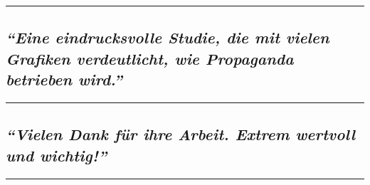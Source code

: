 \begin{center}\rule{0.5\linewidth}{\linethickness}\end{center}

\hypertarget{eine-eindrucksvolle-studie-die-mit-vielen-grafiken-verdeutlicht-wie-propaganda-betrieben-wird}{%
\subsection{\texorpdfstring{\emph{``Eine eindrucks­volle Studie, die mit
vielen Gra­fi­ken verdeut­licht, wie Propaganda betrieben
wird.''}}{``Eine eindrucks­volle Studie, die mit vielen Gra­fi­ken verdeut­licht, wie Propaganda betrieben wird.''}}\label{eine-eindrucksvolle-studie-die-mit-vielen-grafiken-verdeutlicht-wie-propaganda-betrieben-wird}}

\begin{center}\rule{0.5\linewidth}{\linethickness}\end{center}

\hypertarget{vielen-dank-fuxfcr-ihre-arbeit-extrem-wertvoll-und-wichtig}{%
\subsection{\texorpdfstring{\emph{``Vielen Dank für ihre Arbeit. Extrem
wertvoll und
wichtig!''}}{``Vielen Dank für ihre Arbeit. Extrem wertvoll und wichtig!''}}\label{vielen-dank-fuxfcr-ihre-arbeit-extrem-wertvoll-und-wichtig}}

\begin{center}\rule{0.5\linewidth}{\linethickness}\end{center}

